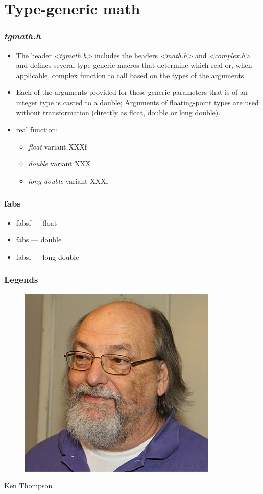 \documentclass{../c-lecture}
\begin{document}
\section{Type-generic math}

\begin{frame}
  \frametitle{\textit{tgmath.h}}
  \begin{itemize}
    \item The header \textit{\color{Orange} <tgmath.h>} includes the headers \textit{\color{LimeGreen} <math.h>} and \textit{\color{LimeGreen} <complex.h>}
      and defines several type-generic macros that determine which real or, when applicable, complex function to call based on the types of the arguments.
    \item Each of the arguments provided for these generic parameters that is of an integer type is casted to a double;
      Arguments of floating-point types are used without transformation (directly as float, double or long double).
    \item real function:
    \begin{itemize}
      \item \textit{float} variant XXXf
      \item \textit{double} variant XXX
      \item \textit{long double} variant XXXl
    \end{itemize}
  \end{itemize}
\end{frame}

\begin{frame}
  \frametitle{fabs}
  \begin{itemize}
    \item fabsf --- float
    \item fabs --- double
    \item fabsl --- long double
  \end{itemize}
\end{frame}

\begin{frame}
  \frametitle{Legends}
  \begin{figure}
    \includegraphics[height=.75\textheight]{./img/ken.jpg}
  \end{figure}
  \pause%
  \centering
  \color{Violet} Ken Thompson
\end{frame}
\end{document}
